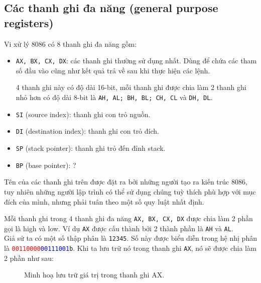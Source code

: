 \documentclass[12pt]{report}
\newcommand{\code}[1]{\texttt{#1}}
\begin{document}
\subsection{Các thanh ghi đa năng (general purpose registers)}
Vi xử lý 8086 có 8 thanh ghi đa năng gồm:
\begin{itemize}
    \item \code{AX, BX, CX, DX}: các thanh ghi thường sử dụng nhất. Dùng để chứa các tham số đầu vào cũng như kết quả trả về sau khi thực hiện các lệnh.
    \par 4 thanh ghi này có độ dài 16-bit, mỗi thanh ghi được chia làm 2 thanh ghi nhỏ hơn có độ dài 8-bit là \code{AH, AL; BH, BL; CH, CL} và \code{DH, DL}.
    \item \code{SI} (source index): thanh ghi con trỏ nguồn.
    \item \code{DI} (destination index): thanh ghi con trỏ đích.
    \item \code{SP} (stack pointer): thanh ghi trỏ đến đỉnh stack.
    \item \code{BP} (base pointer): ?
\end{itemize}

Tên của các thanh ghi trên được đặt ra bởi những người tạo ra kiến trúc 8086, tuy nhiên những người lập trình có thể sử dụng chúng tuỳ thích phù hợp với mục đích của mình, nhưng phải tuân theo một số quy luật nhất định.\bigskip

Mỗi thanh ghi trong 4 thanh ghi đa năng \code{AX, BX, CX, DX} được chia làm 2 phần gọi là high và low. Ví dụ \code{AX} được cấu thành bởi 2 thành phần là \code{AH} và \code{AL}.\\
Giả sử ta có một số thập phân là \code{12345}. Số này được biểu diễn trong hệ nhị phân là \textcolor{red}{\code{00110000}}\textcolor{blue}{\code{00111001}}\code{b}. Khi ta lưu trữ nó trong thanh ghi \code{AX}, nó sẽ được chia làm 2 phần như sau:

\begin{figure}[H]
    \centering
    \caption{Minh hoạ lưu trữ giá trị trong thanh ghi AX.}
\end{figure}
\end{document}
